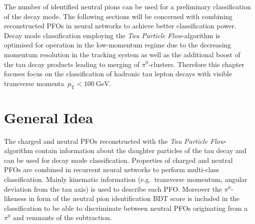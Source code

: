 The number of identified neutral pions can be used for a preliminary
classification of the decay mode. The following sections will be concerned with
combining reconstructed PFOs in neural networks to achieve better classification
power. Decay mode classification employing the \emph{Tau Particle
  Flow}-algorithm is optimised for operation in the low-momentum regime due to
the decreasing momentum resolution in the tracking system as well as the
additional boost of the tau decay products leading to merging of
$\pi^0$-clusters. Therefore this chapter focuses focus on the classification of
hadronic tau lepton decays with visible transverse
momenta~$p_\text{T} < \SI{100}{\giga\electronvolt}$.

\section{General Idea}
\label{sec:pfo_general}

The charged and neutral PFOs reconstructed with the \emph{Tau Particle
  Flow}-algorithm contain information about the daughter particles of the tau
decay and can be used for decay mode classification. Properties of charged and
neutral PFOs are combined in recurrent neural networks to perform multi-class
classification. Mainly kinematic information (e.g.\ transverse momentum, angular
deviation from the tau axis) is used to describe each PFO. Moreover the
$\pi^0$-likeness in form of the neutral pion identification BDT score is
included in the classification to be able to discriminate between neutral PFOs
originating from a $\pi^0$ and remnants of the subtraction.

